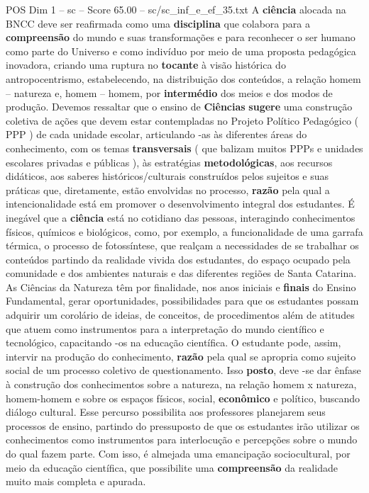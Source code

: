 \begin{textsample}{POS Dim 1 – sc – Score 65.00 – sc/sc\_inf\_e\_ef\_35.txt}
A \textbf{ciência} alocada na BNCC deve ser reafirmada como uma \textbf{disciplina} que colabora para a \textbf{compreensão} do mundo e suas transformações e para reconhecer o ser humano como parte do Universo e como indivíduo por meio de uma proposta pedagógica inovadora, criando uma ruptura no \textbf{tocante} à visão histórica do antropocentrismo, estabelecendo, na distribuição dos conteúdos, a relação homem – natureza e, homem – homem, por \textbf{intermédio} dos meios e dos modos de produção.
Devemos ressaltar que o ensino de \textbf{Ciências} \textbf{sugere} uma construção coletiva de ações que devem estar contempladas no Projeto Político Pedagógico ( PPP ) de cada unidade escolar, articulando -as às diferentes áreas do conhecimento, com os temas \textbf{transversais} ( que balizam muitos PPPs e unidades escolares privadas e públicas ), às estratégias \textbf{metodológicas}, aos recursos didáticos, aos saberes históricos/culturais construídos pelos sujeitos e suas práticas que, diretamente, estão envolvidas no processo, \textbf{razão} pela qual a intencionalidade está em promover o desenvolvimento integral dos estudantes.
É inegável que a \textbf{ciência} está no cotidiano das pessoas, interagindo conhecimentos físicos, químicos e biológicos, como, por exemplo, a funcionalidade de uma garrafa térmica, o processo de fotossíntese, que realçam a necessidades de se trabalhar os conteúdos partindo da realidade vivida dos estudantes, do espaço ocupado pela comunidade e dos ambientes naturais e das diferentes regiões de Santa Catarina.
As Ciências da Natureza têm por finalidade, nos anos iniciais e \textbf{finais} do Ensino Fundamental, gerar oportunidades, possibilidades para que os estudantes possam adquirir um corolário de ideias, de conceitos, de procedimentos além de atitudes que atuem como instrumentos para a interpretação do mundo científico e tecnológico, capacitando -os na educação científica.
O estudante pode, assim, intervir na produção do conhecimento, \textbf{razão} pela qual se apropria como sujeito social de um processo coletivo de questionamento.
Isso \textbf{posto}, deve -se dar ênfase à construção dos conhecimentos sobre a natureza, na relação homem x natureza, homem-homem e sobre os espaços físicos, social, \textbf{econômico} e político, buscando diálogo cultural.
Esse percurso possibilita aos professores planejarem seus processos de ensino, partindo do pressuposto de que os estudantes irão utilizar os conhecimentos como instrumentos para interlocução e percepções sobre o mundo do qual fazem parte.
Com isso, é almejada uma emancipação sociocultural, por meio da educação científica, que possibilite uma \textbf{compreensão} da realidade muito mais completa e apurada.

\end{textsample}
